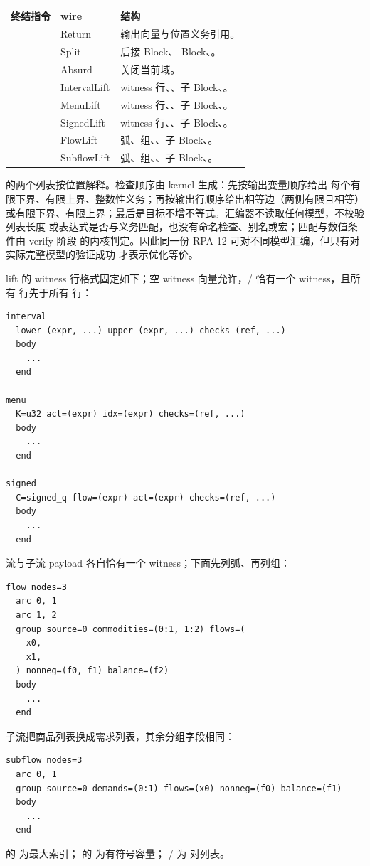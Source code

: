\begin{center}
\begin{tabularx}{\textwidth}{l l Y}
\toprule
终结指令 & wire & 结构 \\
\midrule
{} & Return & 输出向量与位置义务引用。\\
 & Split & 后接  Block、 Block、。\\
 & Absurd & 关闭当前域。\\
 & IntervalLift & witness 行、、子 Block、。\\
 & MenuLift & witness 行、、子 Block、。\\
 & SignedLift & witness 行、、子 Block、。\\
 & FlowLift & 弧、组、、子 Block、。\\
 & SubflowLift & 弧、组、、子 Block、。\\
\bottomrule
\end{tabularx}
\end{center}

 的两个列表按位置解释。检查顺序由 kernel 生成：先按输出变量顺序给出
每个有限下界、有限上界、整数性义务；再按输出行顺序给出相等边（两侧有限且相等）
或有限下界、有限上界；最后是目标不增不等式。汇编器不读取任何模型，不校验列表长度
或表达式是否与义务匹配，也没有命名检查、别名或宏；匹配与数值条件由 verify 阶段
的内核判定。因此同一份 RPA 12 可对不同模型汇编，但只有对实际完整模型的验证成功
才表示优化等价。

lift 的 witness 行格式固定如下；空 witness 向量允许，/
恰有一个 witness，且所有  行先于所有  行：
\begin{lstlisting}
interval
  lower (expr, ...) upper (expr, ...) checks (ref, ...)
  body
    ...
  end

menu
  K=u32 act=(expr) idx=(expr) checks=(ref, ...)
  body
    ...
  end

signed
  C=signed_q flow=(expr) act=(expr) checks=(ref, ...)
  body
    ...
  end
\end{lstlisting}
流与子流 payload 各自恰有一个 witness；下面先列弧、再列组：
\begin{lstlisting}
flow nodes=3
  arc 0, 1
  arc 1, 2
  group source=0 commodities=(0:1, 1:2) flows=(
    x0,
    x1,
  ) nonneg=(f0, f1) balance=(f2)
  body
    ...
  end
\end{lstlisting}
子流把商品列表换成需求列表，其余分组字段相同：
\begin{lstlisting}
subflow nodes=3
  arc 0, 1
  group source=0 demands=(0:1) flows=(x0) nonneg=(f0) balance=(f1)
  body
    ...
  end
\end{lstlisting}
 的  为最大索引； 的  为有符号容量；
/ 为  对列表。

